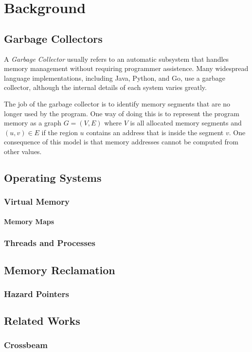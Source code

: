 \chapter{Background}

\section{Garbage Collectors}

A \emph{Garbage Collector} usually refers to an automatic subsystem that handles memory management
without requiring programmer assistence. Many widespread language implementations,
including Java, Python, and Go, use a garbage collector, although the internal details of each
system varies greatly.

The job of the garbage collector is to identify memory segments that are no longer used by the
program. One way of doing this is to represent the program memory as a graph $G=(V, E)$ where $V$ is
all allocated memory segments and $(u, v) \in E$ if the region $u$ contains an address that is
inside the segment $v$. One consequence of this model is that memory addresses cannot be computed
from other values.

\section{Operating Systems}

\todo{}


\subsection{Virtual Memory}

\todo{}

\subsubsection{Memory Maps\label{sec:memory-map}}

\todo{}


\subsection{Threads and Processes}

\todo{}


\section{Memory Reclamation}

\subsection{Hazard Pointers\label{sec:hazard-pointers}}


\section{Related Works}

\subsection{Crossbeam}
